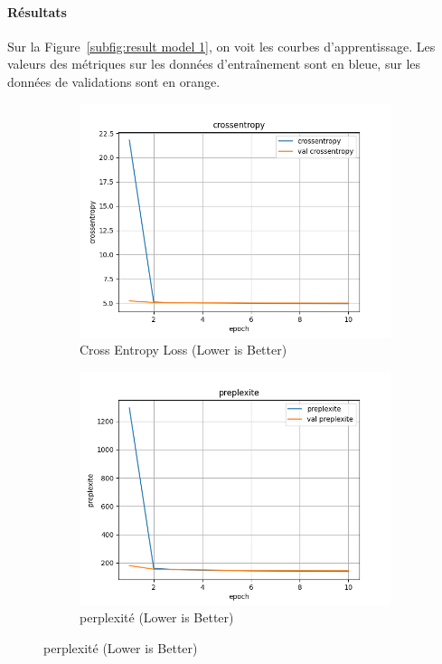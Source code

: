 \documentclass[a4paper]{article}
\begin{document}
\paragraph{Résultats}

Sur la Figure~\ref{subfig:result model 1}, on voit les courbes d'apprentissage. Les valeurs des métriques sur les données d'entraînement sont en bleue, sur les données de validations sont en orange.

\begin{figure}[ht]
  \centering
  \begin{subfigure}{0.47\textwidth}
    \includegraphics[width=\linewidth]{../logs/word2vect/crossentropy.png}
    \caption{Cross Entropy Loss (Lower is Better)}
  \end{subfigure}
  \hfill
  \begin{subfigure}{0.47\textwidth}
    \includegraphics[width=\linewidth]{../logs/word2vect/preplexite.png}
    \caption{perplexité (Lower is Better)}
  \end{subfigure}


\end{figure}
\end{document}
